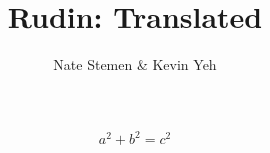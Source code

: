 \documentclass{tufte-book}
\title{Rudin: Translated}
\author{Nate Stemen \& Kevin Yeh}
\begin{document}
\begin{equation}
a^2 + b^2 = c^2
\end{equation}
\end{document}
